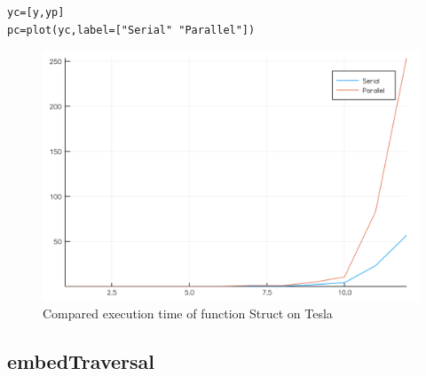 \documentclass[a4paper,12pt]{article}
\begin{document}
\noindent{}

\begin{Verbatim}[fontsize=\footnotesize]
yc=[y,yp]
pc=plot(yc,label=["Serial" "Parallel"])
\end{Verbatim}
\begin{figure}[!h]
\centering
\includegraphics[scale=0.08]{compstruct.png}
\caption{Compared execution time of function Struct  on Tesla}
\end{figure}

\newpage


\subsection{embedTraversal}
\end{document}
